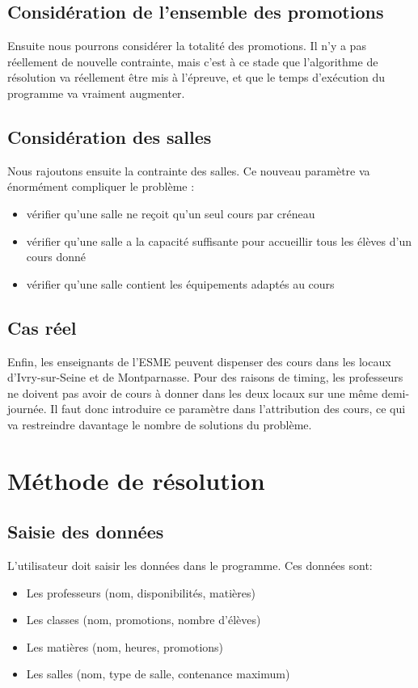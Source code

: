 \documentclass[12pt,a4paper,french]{article}
\begin{document}
\subsection{Considération de l'ensemble des promotions}
Ensuite nous pourrons considérer la totalité des promotions. Il n'y a pas réellement de nouvelle contrainte, mais c'est à ce stade que l'algorithme de résolution va réellement être mis à l'épreuve, et que le temps d'exécution du programme va vraiment augmenter.

\subsection{Considération des salles}
Nous rajoutons ensuite la contrainte des salles. Ce nouveau paramètre va énormément compliquer le problème :
\begin{itemize}
\item vérifier qu'une salle ne reçoit qu'un seul cours par créneau
\item vérifier qu'une salle a la capacité suffisante pour accueillir tous les élèves d'un cours donné
\item vérifier qu'une salle contient les équipements adaptés au cours
\end{itemize}

\subsection{Cas réel}
Enfin, les enseignants de l'ESME peuvent dispenser des cours dans les locaux d'Ivry-sur-Seine et de Montparnasse. Pour des raisons de timing, les professeurs ne doivent pas avoir de cours à donner dans les deux locaux sur une même demi-journée. Il faut donc introduire ce paramètre dans l'attribution des cours, ce qui va restreindre davantage le nombre de solutions du problème.

\newpage
\section{Méthode de résolution}

\subsection{Saisie des données}
L'utilisateur doit saisir les données dans le programme. Ces données sont:
\begin{itemize}
\item Les professeurs (nom, disponibilités, matières)
\item Les classes (nom, promotions, nombre d'élèves)
\item Les matières (nom, heures, promotions)
\item Les salles (nom, type de salle, contenance maximum) 
\end{itemize}
\end{document}

